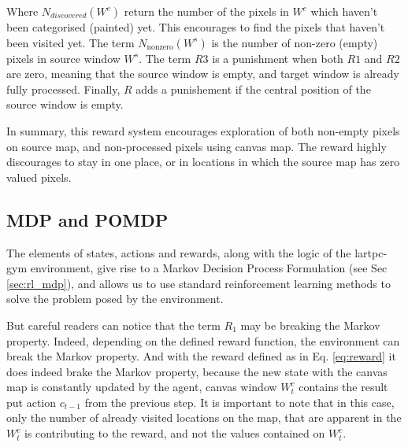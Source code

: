 Where \(N_{discovered}(W^{c})\) return the number of the pixels in $W^{c}$ which haven't been categorised (painted) yet. 
This encourages to find the pixels that haven't been visited yet.
The term $N_{\mathrm{nonzero}}(W^{s})$ is the number of non-zero (empty) pixels in source window $W^s$.
The term $R3$ is a punishment when both $R1$ and $R2$ are zero, meaning that the source window is empty, and target window is already fully processed.
Finally, $R$ adds a punishement if the central position of the source window is empty.

In summary, this reward system encourages exploration of both non-empty pixels on source map, and non-processed pixels using canvas map.
The reward highly discourages to stay in one place, or in locations in which the source map has zero valued pixels.

\subsection{MDP and POMDP}

The elements of states, actions and rewards, along with the logic of the lartpc-gym environment, give rise to a Markov Decision Process Formulation (see Sec \ref{sec:rl_mdp}), and allows us to use standard reinforcement learning methods to solve the problem posed by the environment.

But careful readers can notice that the term $R_{1}$ may be breaking the Markov property.
Indeed, depending on the defined reward function, the environment can break the Markov property. 
And with the reward defined as in Eq. \ref{eq:reward} it does indeed brake the Markov property, because the new state with the canvas map is constantly updated by the agent, canvas window $W^{c}_{t}$ contains the result put action $c_{t-1}$ from the previous step. It is important to note that in this case, only the number of already visited locations on the map, that are apparent in the $W^{c}_{t}$ is contributing to the reward, and not the values contained on $W^{c}_{t}$. 

